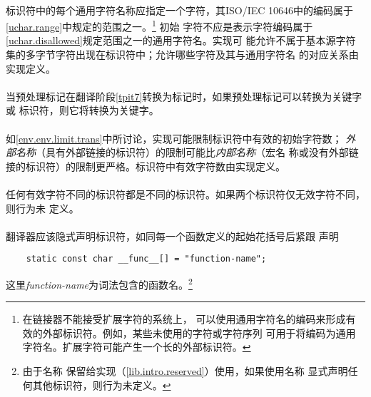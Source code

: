 {\paragraph{}
标识符中的每个通用字符名称应指定一个字符，其ISO/IEC 10646中的编码属于
\ref{uchar.range}中规定的范围之一。\footnote{在链接器不能接受扩展字符的系统上，
可以使用通用字符名的编码来形成有效的外部标识符。例如，某些未使用的字符或字符序列
可用于将编码为通用字符名。扩展字符可能产生一个长的外部标识符。} 初始
字符不应是表示字符编码属于\ref{uchar.disallowed}规定范围之一的通用字符名。实现可
能允许不属于基本源字符集的多字节字符出现在标识符中；允许哪些字符及其与通用字符名
的对应关系由实现定义。

\paragraph{}
当预处理标记在翻译阶段\ref{tpit7}转换为标记时，如果预处理标记可以转换为关键字或
标识符，则它将转换为关键字。

\implimit
\paragraph{}
如\ref{env.env.limit.trans}中所讨论，实现可能限制标识符中有效的初始字符数；
\textit{外部名称}（具有外部链接的标识符）的限制可能比\textit{内部名称}（宏名
称或没有外部链接的标识符）的限制更严格。标识符中有效字符数由实现定义。

\paragraph{}
任何有效字符不同的标识符都是不同的标识符。如果两个标识符仅无效字符不同，则行为未
定义。


\semantic
\paragraph{}
翻译器应该隐式声明标识符，如同每一个函数定义的起始花括号后紧跟
声明
\begin{lstlisting}
    static const char __func__[] = "function-name";
\end{lstlisting}
这里\textit{function-name}为词法包含的函数名。\footnote{由于名称
保留给实现（\ref{lib.intro.reserved}）使用，如果使用名称
显式声明任何其他标识符，则行为未定义。}

}
